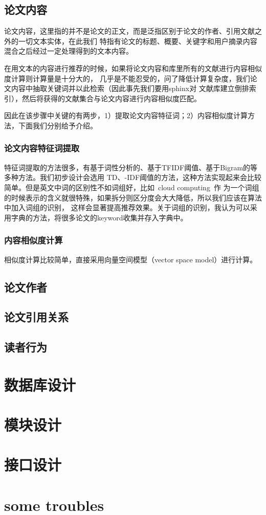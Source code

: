 \documentclass[a4paper]{article}
\begin{document}
\subsection{论文内容}
论文内容，这里指的并不是论文的正文，而是泛指区别于论文的作者、引用文献之外的一切文本实体，在此我们%
特指有论文的标题、概要、关键字和用户摘录内容混合之后经过一定处理得到的文本内容。

在用文本的内容进行推荐的时候，如果将论文内容和库里所有的文献进行内容相似度计算则计算量是十分大的，%
几乎是不能忍受的，问了降低计算复杂度，我们论文内容中抽取关键词并以此检索（因此事先我们要用sphinx对%
文献库建立倒排索引），然后将获得的文献集合与论文内容进行内容相似度匹配。

因此在该步骤中关键的有两步，1）提取论文内容特征词；2）内容相似度计算方法，下面我们分别给予介绍。
\subsubsection{论文内容特征词提取}
特征词提取的方法很多，有基于词性分析的、基于TF\-IDF阈值、基于Bigram的等多种方法。我们初步设计会选用%
TD、-IDF阈值的方法，这种方法实现起来会比较简单。但是英文中词的区别性不如词组好，比如~cloud computing~作%
为一个词组的时候表示的含义就很特殊，如果拆分则区分度会大大降低，所以我们应该在算法中加入词组的识别，%
这样会显著提高推荐效果。关于词组的识别，我认为可以采用字典的方法，将很多论文的keyword收集并存入字典中。%
\subsubsection{内容相似度计算}
相似度计算比较简单，直接采用向量空间模型（vector space model）进行计算。
\subsection{论文作者}
\subsection{论文引用关系}
\subsection{读者行为}
\section{数据库设计}
\section{模块设计}
\section{接口设计}
\section{some troubles}
\end{document}
